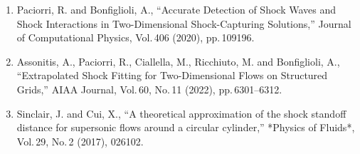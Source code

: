 \documentclass[a4j]{jarticle}
\begin{document}
\begin{enumerate}
  \item Paciorri, R. and Bonfiglioli, A., ``Accurate Detection of Shock Waves and Shock Interactions in Two-Dimensional Shock-Capturing Solutions,'' 
  Journal of Computational Physics, Vol.\,406 (2020), pp.\,109196.
  \label{ref:intera}

  \item Assonitis, A., Paciorri, R., Ciallella, M., Ricchiuto, M. and Bonfiglioli, A., ``Extrapolated Shock Fitting for Two-Dimensional Flows on Structured Grids,'' 
  AIAA Journal, Vol.\,60, No.\,11 (2022), pp.\,6301--6312.
  \label{ref:SF}

  \item Sinclair, J. and Cui, X., ``A theoretical approximation of the shock standoff distance for supersonic flows around a circular cylinder,'' 
  *Physics of Fluids*, Vol.\,29, No.\,2 (2017), 026102.
  \label{ref:SinclairCui}

\end{enumerate}
\end{document}
